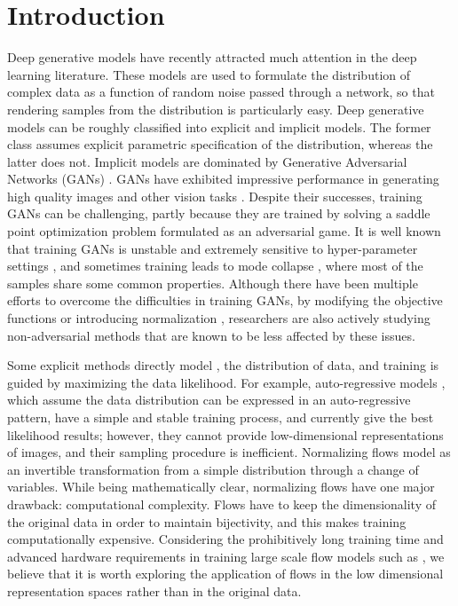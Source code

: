 \documentclass{article}
\begin{document}
\section{Introduction} \label{intro}
Deep generative models have recently attracted much attention in the deep learning literature. These models are used to formulate the distribution of complex data as a function of random noise passed through a network, so that rendering samples from the distribution is particularly easy. Deep generative models can be roughly classified into explicit and
implicit models. The former class assumes explicit parametric specification of the distribution, whereas the latter does not. Implicit models are dominated by Generative Adversarial Networks (GANs) \citep{GAN,DCGAN}. GANs have exhibited impressive performance in generating high quality images \citep{biggan} and other vision tasks \citep{cycgan,super}. Despite their successes, training GANs can be challenging, partly because they are trained by solving a saddle point optimization problem formulated as an adversarial game. It is well known that training GANs is unstable and extremely sensitive to hyper-parameter settings \citep{improve,equi}, and sometimes training leads to mode collapse \citep{tutorial}, where most of the samples share some common properties. Although there have been multiple efforts to overcome the difficulties in training GANs, by modifying the objective functions or introducing normalization \citep{wgan,unroll,VEE,spectralnorm}, researchers are also actively studying non-adversarial methods that are known to be less affected by these issues.  

Some explicit methods directly model , the distribution of data, and training is guided by maximizing the data likelihood. For example, auto-regressive models \citep{MAF,PIXELRNN}, which assume the data distribution can be expressed in an auto-regressive pattern, have a simple and stable training process, and currently give the best likelihood results; however, they cannot provide low-dimensional representations of images, and their sampling procedure is inefficient. Normalizing flows \citep{NICE,REAL,GLOW} model  as an invertible transformation from a simple distribution through a change of variables. While being mathematically clear, normalizing flows have one major drawback: computational complexity. Flows have to keep the dimensionality of the original data in order to maintain bijectivity, and this makes training computationally expensive. Considering the prohibitively long training time and advanced hardware requirements in training large scale flow models such as \citep{GLOW}, we believe that it is worth exploring the application of flows in the low dimensional representation spaces rather than in the original data.  
\end{document}
